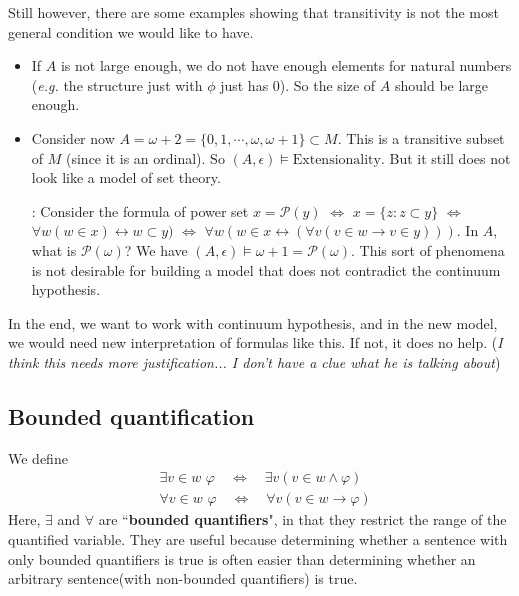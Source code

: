 \documentclass[12pt,a4paper]{article}
\newenvironment{subproof}
{\begin{changemargin}{0.5cm}{0.5cm} 
	}%
	{\end{changemargin}
}
\renewenvironment{i}
{\begin{itemize} 
	}%
	{\end{itemize}
}
\begin{document}
Still however, there are some examples showing that transitivity is not the most general condition we would like to have.
\begin{i}
\item If $A$ is not large enough, we do not have enough elements for natural numbers (\textit{e.g.} the structure just with $\phi$ just has 0). So the size of $A$ should be large enough.

\item Consider now $A= \omega +2 = \{0,1, \cdots, \omega, \omega+1 \} \subset M$. This is a transitive subset of $M$ (since it is an ordinal). So $(A, \epsilon) \models \text{Extensionality}$. But it still does not look like a model of set theory.
\begin{subproof}
: Consider the formula of power set $x = \mathscr{P}(y)$ $\Leftrightarrow$ $x= \{z : z\subset y \}$ $\Leftrightarrow$ $\forall w(w\in x) \leftrightarrow w\subset y)$ $\Leftrightarrow$ $\forall w (w\in x \leftrightarrow (\forall v(v\in w \rightarrow v\in y)))$. In $A$, what is $\mathscr{P}(\omega)$? We have $(A, \epsilon) \models \omega +1 = \mathscr{P}(\omega)$. This sort of phenomena is not desirable for building a model that does not contradict the continuum hypothesis.
\end{subproof}
\end{i}
\s

In the end, we want to work with continuum hypothesis, and in the new model, we would need new interpretation of formulas like this. If not, it does no help. (\emph{I think this needs more justification... I don't have a clue what he is talking about})
\s

\subsection*{Bounded quantification}

We define
\begin{align*}
&\exists v\in w \,\, \varphi \quad \Leftrightarrow \quad \exists v (v\in w\wedge \varphi) \\
&\forall v\in w \,\, \varphi \quad \Leftrightarrow \quad \forall v (v\in w \rightarrow \varphi)
\end{align*}
Here, $\exists$ and $\forall$ are ``\textbf{bounded quantifiers}", in that they restrict the range of the quantified variable. They are useful because determining whether a sentence with only bounded quantifiers is true is often easier than determining whether an arbitrary sentence(with non-bounded quantifiers) is true.
\s
\end{document}
